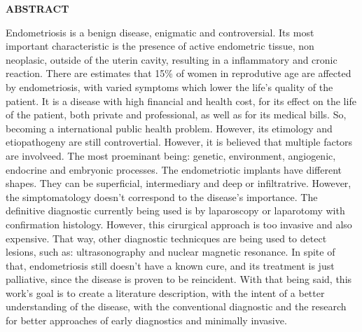 \documentclass[12pt]{article} %
\begin{document}
\newpage
\begin{center}
\MakeUppercase{\textbf{Abstract}}
\end{center}

Endometriosis is a benign disease, enigmatic and controversial.  Its
most important characteristic is the presence of active endometric
tissue, non neoplasic, outside of the uterin cavity, resulting in a
inflammatory and cronic reaction.
There are estimates that 15\% of women in reprodutive age are affected
by endometriosis, with varied symptoms which lower the life's quality
of the patient. It is a disease with high financial and health cost,
for its effect on the life of the patient, both private and
professional, as well as for its medical bills. So, becoming a
international public health problem.
However, its etimology and etiopathogeny are still
controvertial. However, it is believed that multiple factors are
involveed. The most proeminant being: genetic, environment,
angiogenic, endocrine and embryonic processes.
The endometriotic implants have different shapes. They can be
superficial, intermediary and deep or infiltratrive. However, the
simptomatology doesn't correspond to the disease's importance.
The definitive diagnostic currently being used is by laparoscopy or
laparotomy with confirmation histology. However, this cirurgical
approach is too invasive and also expensive. That way, other
diagnostic technicques are being used to detect lesions, such as:
ultrasonography and nuclear magnetic resonance.
In spite of that, endometriosis still doesn't have a known cure, and
its treatment is just palliative, since the disease is proven
to be reincident.
With that being said, this work's goal is to create a literature
description, with the intent of a better understanding of the disease,
with the conventional diagnostic and the research for better
approaches of early diagnostics and minimally invasive.

\newpage

\listoffigures
{} \selectfont




\newpage

\tableofcontents
{} \selectfont


\newpage







\end{document}
